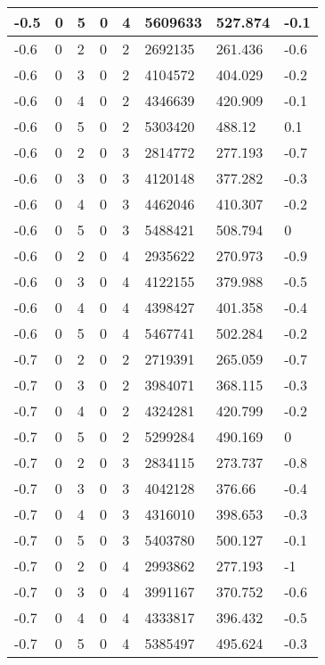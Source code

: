 \begin{longtable}{|p{1.4cm}|p{1.4cm}|p{1.4cm}|p{1.4cm}|p{1.4cm}|p{1.4cm}|p{1.4cm}|p{1.5cm}|}
        -0.5 & 0 & 5 & 0 & 4 & 5609633 & 527.874 & -0.1 \\ \hline
        -0.6 & 0 & 2 & 0 & 2 & 2692135 & 261.436 & -0.6 \\ \hline
        -0.6 & 0 & 3 & 0 & 2 & 4104572 & 404.029 & -0.2 \\ \hline
        -0.6 & 0 & 4 & 0 & 2 & 4346639 & 420.909 & -0.1 \\ \hline
        -0.6 & 0 & 5 & 0 & 2 & 5303420 & 488.12 & 0.1 \\ \hline
        -0.6 & 0 & 2 & 0 & 3 & 2814772 & 277.193 & -0.7 \\ \hline
        -0.6 & 0 & 3 & 0 & 3 & 4120148 & 377.282 & -0.3 \\ \hline
        -0.6 & 0 & 4 & 0 & 3 & 4462046 & 410.307 & -0.2 \\ \hline
        -0.6 & 0 & 5 & 0 & 3 & 5488421 & 508.794 & 0 \\ \hline
        -0.6 & 0 & 2 & 0 & 4 & 2935622 & 270.973 & -0.9 \\ \hline
        -0.6 & 0 & 3 & 0 & 4 & 4122155 & 379.988 & -0.5 \\ \hline
        -0.6 & 0 & 4 & 0 & 4 & 4398427 & 401.358 & -0.4 \\ \hline
        -0.6 & 0 & 5 & 0 & 4 & 5467741 & 502.284 & -0.2 \\ \hline
        -0.7 & 0 & 2 & 0 & 2 & 2719391 & 265.059 & -0.7 \\ \hline
        -0.7 & 0 & 3 & 0 & 2 & 3984071 & 368.115 & -0.3 \\ \hline
        -0.7 & 0 & 4 & 0 & 2 & 4324281 & 420.799 & -0.2 \\ \hline
        -0.7 & 0 & 5 & 0 & 2 & 5299284 & 490.169 & 0 \\ \hline
        -0.7 & 0 & 2 & 0 & 3 & 2834115 & 273.737 & -0.8 \\ \hline
        -0.7 & 0 & 3 & 0 & 3 & 4042128 & 376.66 & -0.4 \\ \hline
        -0.7 & 0 & 4 & 0 & 3 & 4316010 & 398.653 & -0.3 \\ \hline
        -0.7 & 0 & 5 & 0 & 3 & 5403780 & 500.127 & -0.1 \\ \hline
        -0.7 & 0 & 2 & 0 & 4 & 2993862 & 277.193 & -1 \\ \hline
        -0.7 & 0 & 3 & 0 & 4 & 3991167 & 370.752 & -0.6 \\ \hline
        -0.7 & 0 & 4 & 0 & 4 & 4333817 & 396.432 & -0.5 \\ \hline
        -0.7 & 0 & 5 & 0 & 4 & 5385497 & 495.624 & -0.3 \\ \hline
\end{longtable}
